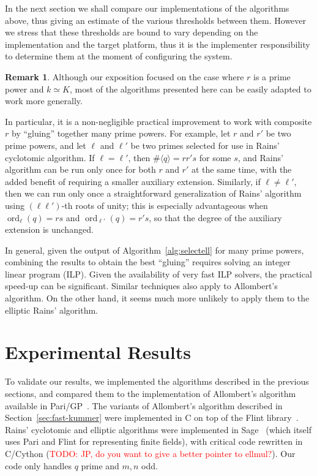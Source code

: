 \documentclass[12pt]{article}
\theoremstyle{plain}
\theoremstyle{definition}
\newtheorem*{remark}{Remark}
\newcommand{\todo}[1]{\textcolor{red}{TODO: #1}}
\DeclareMathOperator{\order}{ord} %
\newcounter{algorithm}
\begin{document}
In the next section we shall compare our implementations of the
algorithms above, thus giving an estimate of the various thresholds
between them.  However we stress that these thresholds are bound to
vary depending on the implementation and the target platform, thus it
is the implementer responsibility to determine them at the moment of
configuring the system.

\begin{remark}
  Although our exposition focused on the case where $r$ is a prime
  power and $k\simeq K$, most of the algorithms presented here can be
  easily adapted to work more generally.

  In particular, it is a non-negligible practical improvement to work
  with composite $r$ by ``gluing'' together many prime powers. For
  example, let $r$ and $r'$ be two prime powers, and let $\ell$ and
  $\ell'$ be two primes selected for use in Rains' cyclotomic
  algorithm. If $\ell=\ell'$, then $\#\langle q\rangle=rr's$ for some
  $s$, and Rains' algorithm can be run only once for both $r$ and $r'$
  at the same time, with the added benefit of requiring a smaller
  auxiliary extension. Similarly, if $\ell\ne\ell'$, then we can run
  only once a straightforward generalization of Rains' algorithm using
  $(\ell\ell')$-th roots of unity; this is especially advantageous
  when $\order_\ell(q) = rs$ and $\order_{\ell'}(q) = r's$, so that
  the degree of the auxiliary extension is unchanged.

  In general, given the output of Algorithm~\ref{alg:selectell} for
  many prime powers, combining the results to obtain the best
  ``gluing'' requires solving an integer linear program (ILP). Given
  the availability of very fast ILP solvers, the practical speed-up
  can be significant.  Similar techniques also apply to Allombert's
  algorithm. On the other hand, it seems much more unlikely to apply
  them to the elliptic Rains' algorithm.
\end{remark}



\section{Experimental Results}

To validate our results, we implemented the algorithms described in
the previous sections, and compared them to the implementation of
Allombert's algorithm available in Pari/GP~\cite{Pari}. The variants
of Allombert's algorithm described in Section~\ref{sec:fast-kummer}
were implemented in C on top of the Flint
library~\cite{hart2010flint}. Rains' cyclotomic and elliptic
algorithms were implemented in Sage~\cite{Sage} (which itself uses
Pari and Flint for representing finite fields), with critical code
rewritten in C/Cython (\todo{JP, do you want to give a better pointer
  to ellmul?}). Our code only handles $q$ prime and $m,n$ odd.
\end{document}
